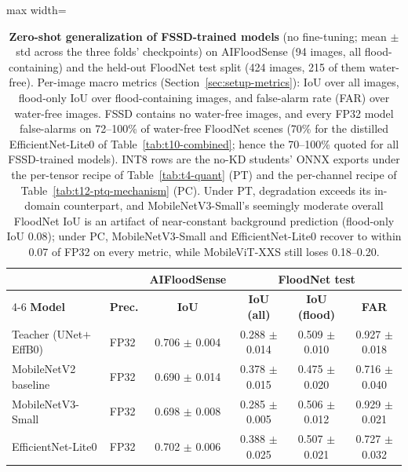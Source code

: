 \begin{table}[ht]
\centering
\caption{\textbf{Zero-shot generalization of FSSD-trained models} (no fine-tuning; mean $\pm$ std across the three folds' checkpoints) on AIFloodSense (94 images, all flood-containing) and the held-out FloodNet test split (424 images, 215 of them water-free). Per-image macro metrics (Section~\ref{sec:setup-metrics}): IoU over all images, flood-only IoU over flood-containing images, and false-alarm rate (FAR) over water-free images. FSSD contains no water-free images, and every FP32 model false-alarms on 72--100\% of water-free FloodNet scenes (70\% for the distilled EfficientNet-Lite0 of Table~\ref{tab:t10-combined}; hence the 70--100\% quoted for all FSSD-trained models). INT8 rows are the no-KD students' ONNX exports under the per-tensor recipe of Table~\ref{tab:t4-quant} (PT) and the per-channel recipe of Table~\ref{tab:t12-ptq-mechanism} (PC). Under PT, degradation exceeds its in-domain counterpart, and MobileNetV3-Small's seemingly moderate overall FloodNet IoU is an artifact of near-constant background prediction (flood-only IoU 0.08); under PC, MobileNetV3-Small and EfficientNet-Lite0 recover to within 0.07 of FP32 on every metric, while MobileViT-XXS still loses 0.18--0.20.}
\label{tab:t9-zeroshot}
\small
\setlength{\tabcolsep}{4pt}
\begin{adjustbox}{max width=\textwidth}
\begin{tabular}{llcccc}
\toprule
& & \textbf{AIFloodSense} & \multicolumn{3}{c}{\textbf{FloodNet test}} \\
\cmidrule(lr){4-6}
\textbf{Model} & \textbf{Prec.} & \textbf{IoU} & \textbf{IoU (all)} & \textbf{IoU (flood)} & \textbf{FAR} \\
\midrule
Teacher (UNet$+$EffB0)  & FP32 & 0.706 $\pm$ 0.004 & 0.288 $\pm$ 0.014 & 0.509 $\pm$ 0.010 & 0.927 $\pm$ 0.018 \\
MobileNetV2 baseline    & FP32 & 0.690 $\pm$ 0.014 & 0.378 $\pm$ 0.015 & 0.475 $\pm$ 0.020 & 0.716 $\pm$ 0.040 \\
MobileNetV3-Small       & FP32 & 0.698 $\pm$ 0.008 & 0.285 $\pm$ 0.005 & 0.506 $\pm$ 0.012 & 0.929 $\pm$ 0.021 \\
EfficientNet-Lite0      & FP32 & 0.702 $\pm$ 0.006 & 0.388 $\pm$ 0.025 & 0.507 $\pm$ 0.021 & 0.727 $\pm$ 0.032 \\

\end{tabular}
\end{adjustbox}
\end{table}
